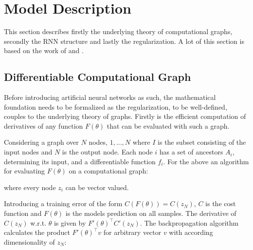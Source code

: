 \chapter{Model Description}

This section describes firstly the underlying theory of computational graphs, secondly the RNN structure and lastly the regularization. A lot of this section is based on the work of \textcite{suts} and \textcite{Martens2012}.

\section{Differentiable Computational Graph}

Before introducing artificial neural networks as such, the mathematical foundation needs to be formalized as the regularization, to be well-defined, couples to the underlying theory of graphs. Firstly is the efficient computation of derivatives of any function $F(\theta)$ that can be evaluated with such a graph. 

Considering a graph over $N$ nodes, $1, ..., N$ where $I$ is the subset consisting of the input nodes and $N$ is the output node. Each node $i$ has a set of ancestors $A_i$, determining its input, and a differentiable function $f_i$. For the above an algorithm for evaluating $F(\theta)$ on a computational graph:

\begin{algorithmic}[1]
    \EndFor
\end{algorithmic}

where every node $z_i$ can be vector valued.

Introducing a training error of the form $C(F(\theta)) = C(z_N)$, $C$ is the cost function and $F(\theta)$ is the models prediction on all samples. The derivative of $C(z_N)$ w.r.t. $\theta$ is given by $F'(\theta)^\top C'(z_N)$. The backpropagation algorithm calculates the product $F'(\theta)^\top v$ for arbitrary vector $v$ with according dimensionality of $z_N$:

\begin{algorithmic}[1]
    \EndFor
    \EndFor
\end{algorithmic}

